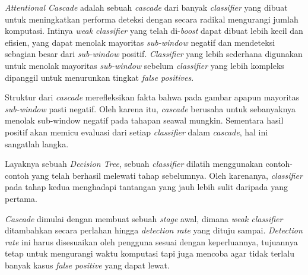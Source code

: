 \emph{Attentional Cascade} adalah sebuah \emph{cascade} dari banyak 
\emph{classifier} yang dibuat untuk meningkatkan performa deteksi dengan secara radikal mengurangi jumlah 
komputasi. Intinya \emph{weak classifier} yang telah di-\emph{boost} dapat dibuat lebih 
kecil dan efisien, yang dapat menolak mayoritas \emph{sub-window} negatif dan 
mendeteksi sebagian besar dari \emph{sub-window} positif. \emph{Classifier} yang lebih 
sederhana digunakan untuk menolak mayoritas \emph{sub-window} sebelum \emph{classifier} 
yang lebih kompleks dipanggil untuk menurunkan tingkat \emph{false positives}.

Struktur dari \emph{cascade} merefleksikan 
fakta bahwa pada gambar apapun mayoritas \emph{sub-window} pasti negatif. 
Oleh karena itu, \emph{cascade} berusaha untuk sebanyaknya menolak sub-window 
negatif pada tahapan seawal mungkin. Sementara hasil positif 
akan memicu evaluasi dari setiap \emph{classifier} dalam \emph{cascade}, 
hal ini sangatlah langka.

Layaknya sebuah \emph{Decision Tree}, sebuah \emph{classifier} dilatih menggunakan 
contoh-contoh yang telah berhasil melewati tahap sebelumnya. Oleh karenanya, 
\emph{classifier} pada tahap kedua menghadapi tantangan yang jauh lebih sulit 
daripada yang pertama.

\emph{Cascade} dimulai dengan membuat sebuah \textit{stage} awal, dimana \textit{weak classifier} 
ditambahkan secara perlahan hingga \emph{detection rate} yang dituju sampai. \emph{Detection rate} 
ini harus disesuaikan oleh pengguna sesuai dengan keperluannya, tujuannya tetap untuk mengurangi 
waktu komputasi tapi juga mencoba agar tidak terlalu banyak kasus \emph{false positive} yang dapat 
lewat.

